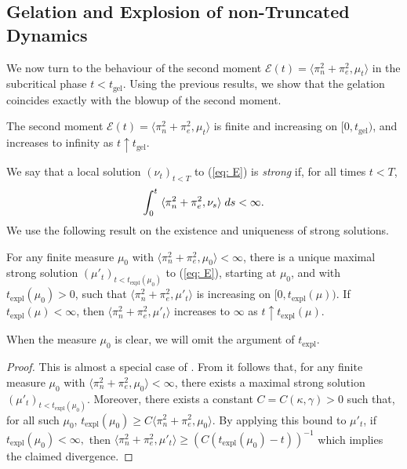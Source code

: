 \subsection{Gelation and Explosion of non-Truncated Dynamics} We now turn to the behaviour of the second moment $\mathcal{E}(t)=\langle \pi_n^2+\pi_e^2, \mu_t\rangle$ in the subcritical phase $t<t_\mathrm{gel}$. Using the previous results, we show that the gelation coincides exactly with the blowup of the second moment. 
\begin{lemma}\label{lemma: second moment before tgel} The second moment $\mathcal{E}(t)=\langle \pi_n^2+\pi_e^2, \mu_t\rangle$ is finite and increasing on $[0, t_\mathrm{gel})$, and increases to infinity as $t\uparrow t_\mathrm{gel}$. \end{lemma}  We say that a local solution $(\nu_t)_{t<T}$ to (\ref{eq: E}) is \emph{strong} if, for all times $t<T$, 
\begin{equation}
    \int_0^t  \hspace{0.1cm} \langle\pi_n^2+\pi_e^2, \nu_s\rangle  \hspace{0.1cm} ds<\infty.
\end{equation} We use the following result on the existence and uniqueness of strong solutions. 
\begin{lemma}\label{lemma: strong solutions} For any finite measure $\mu_0$ with $\langle \pi_n^2+\pi_e^2, \mu_0\rangle <\infty$, there is a unique maximal strong solution $(\mu'_t)_{t<t_\mathrm{expl}(\mu_0)}$ to (\ref{eq: E}), starting at $\mu_0$, and with $t_\mathrm{expl}(\mu_0)>0$, such that $ \langle \pi_n^2+\pi_e^2, \mu'_t\rangle$ is increasing on $[0,t_\mathrm{expl}(\mu))$. If $t_\mathrm{expl}(\mu)<\infty$, then $\langle \pi_n^2+\pi_e^2, \mu'_t\rangle$ increases to $\infty$  as $t\uparrow t_\mathrm{expl}(\mu)$.  \end{lemma} When the measure $\mu_0$ is clear, we will omit the argument of $t_\mathrm{expl}.$ 
\begin{proof}
    This is almost a special case of \cite[Thrm. 2.1]{N00}. From \cite[Theorem 2.1]{N00} it follows that, for any finite measure $\mu_0$ with $\langle \pi_n^2+\pi_e^2, \mu_0\rangle <\infty$, there exists a maximal strong solution $(\mu'_t)_{t<t_\mathrm{expl}(\mu_0)}$. Moreover, there exists a constant $C=C(\kappa, \gamma)>0$ such that, for all such $\mu_0$,  $t_\mathrm{expl}(\mu_0) \ge C \langle \pi_n^2+\pi_e^2, \mu_0\rangle$. By applying this bound to $\mu'_t$, if $t_\mathrm{expl}(\mu_0)<\infty,$ then $\langle \pi_n^2 +\pi_e^2, \mu'_t\rangle \ge (C(t_\mathrm{expl}(\mu_0)-t))^{-1}$  which implies the claimed divergence.
\end{proof}

